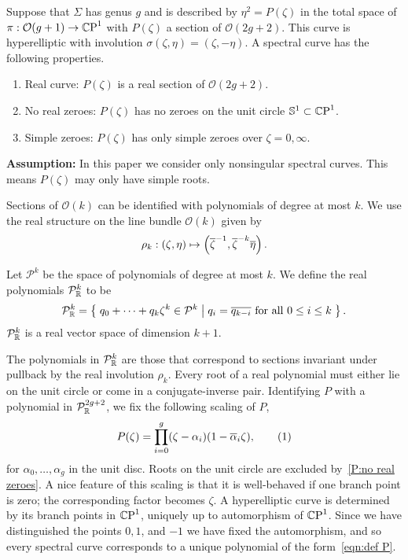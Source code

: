 \documentclass{article}
\begin{document}
Suppose that $\Sigma$ has genus $g$ and is described by $\eta^2 = P(\zeta)$ in the total space of $\pi: \mathcal{O}(g+1) \to \mathbb{C}\text{P}^1$ with $P(\zeta)$ a section of $\mathcal{O}(2g+2)$. This curve is hyperelliptic with involution $\sigma(\zeta,\eta) = (\zeta,-\eta)$. 
A spectral curve has the following properties.
\begin{enumerate}[label=(P.\arabic*)]
    \item\label{P:real curve} Real curve: $P(\zeta)$ is a real section of $\mathcal{O}(2g+2)$.
    \item\label{P:no real zeroes} No real zeroes: $P(\zeta)$ has no zeroes on the unit circle $\mathbb{S}^1\subset\mathbb{C}\text{P}^1$.
    \item\label{P:simple zeroes} Simple zeroes: $P(\zeta)$ has only simple zeroes over $\zeta = 0,\infty$.
\end{enumerate}

\textbf{Assumption:} In this paper we consider only nonsingular spectral curves. This means $P(\zeta)$ may only have simple roots.

Sections of $\mathcal{O}(k)$ can be identified with polynomials of degree at most $k$. 
We use the real structure on the line bundle $\mathcal{O}(k)$ given by
\[
\rho_k : (\zeta,\eta) \mapsto \left(\overline{\zeta}^{-1}, \overline{\zeta}^{-k}\overline{\eta}\right).
\]
\begin{defn}\label{def:mathcal P}
Let $\mathcal{P}^k$ be the space of polynomials of degree at most $k$. We define the real polynomials $\mathcal{P}^k_{\mathbb{R}}$ to be
\[
\mathcal{P}^k_{\mathbb{R}}
= \left\{\;  q_0 + \cdots + q_k \zeta^k \in \mathcal{P}^k  \;\middle|\;  q_i = \overline{q_{k-i}} \text{ for all } 0 \leq i \leq k \;\right\}.
\]
$\mathcal{P}^k_{\mathbb{R}}$ is a real vector space of dimension $k+1$.
\end{defn}
The polynomials in $\mathcal{P}^k_{\mathbb{R}}$ are those that correspond to sections invariant under pullback by the real involution $\rho_k$. 
Every root of a real polynomial must either lie on the unit circle or come in a conjugate-inverse pair. Identifying $P$ with a polynomial in $\mathcal{P}^{2g+2}_{\mathbb{R}}$, we fix the following scaling of $P$,
\[
    P(\zeta) = \prod_{i=0}^{g} (\zeta - \alpha_i)(1 -\bar{\alpha}_i \zeta),
    \labelthis{eqn:def P}
\]
for $\alpha_0,\ldots,\alpha_g$ in the unit disc. Roots on the unit circle are excluded by~\ref{P:no real zeroes}.
A nice feature of this scaling is that it is well-behaved if one branch point is zero; the corresponding factor becomes $\zeta$. A hyperelliptic curve is determined by its branch points in $\mathbb{C}\text{P}^1$, uniquely up to automorphism of $\mathbb{C}\text{P}^1$. Since we have distinguished the points $0,1$, and $-1$ we have fixed the automorphism, and so every spectral curve corresponds to a unique polynomial of the form~\eqref{eqn:def P}.
\end{document}

